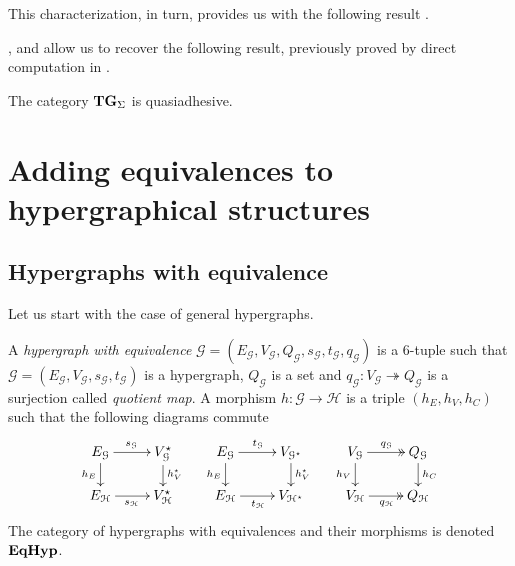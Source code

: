\documentclass[a4paper,UKenglish,cleveref,pdftex,thm-restate,numberwithinsect]{lipics-v2021}
\newcommand{\catname}[1]{\textbf{\textup{#1}}}
\newcommand{\hyp}{\catname{Hyp}}
\newcommand{\EqHyp}{\catname{EqHyp}} %
\newcommand{\tg}[0]{\catname{TG}_{\Sigma}}
\newcommand{\eto}{\twoheadrightarrow}
\begin{document}
This characterization, in turn, provides us with the following result \cite{CastelnovoGM24,castelnovo2023thesis}. 



,  and  allow us to recover the following result, previously proved by direct computation in \cite[Thm.~4.2]{CorradiniG05}.
\begin{corollary}
	The category $\tg$ is quasiadhesive.
\end{corollary}

\section{Adding equivalences to hypergraphical structures}
\label{hypereq}

\subsection{Hypergraphs with equivalence}

Let us start with the case of general hypergraphs.

\begin{definition}
	A \emph{hypergraph with equivalence} $\mathcal{G} = (E_\mathcal{G}, V_{\mathcal{G}}, Q_\mathcal{G}, s_\mathcal{G}, t_\mathcal{G}, q_\mathcal{G})$ is a 6-tuple such that $\mathcal{G} = (E_\mathcal{G}, V_{\mathcal{G}}, s_\mathcal{G}, t_\mathcal{G})$ is a hypergraph, $Q_\mathcal{G}$ is a set and $q_{\mathcal{G}}: V_{\mathcal{G}}\eto Q_{\mathcal{G}}$ is a surjection called \emph{quotient map}. 
	A morphism $h\colon \mathcal{G\to H}$ is a triple $(h_E, h_V, h_C)$ such that the following diagrams commute
	\[\xymatrix@R=15pt{
		{E_\mathcal{G}}\ar[r]^{s_\mathcal{G}}\ar[d]_{h_E} & {V_{\mathcal{G}}^\star}\ar[d]^{h_V^\star} & {E_\mathcal{G}}\ar[r]^{t_\mathcal{G}}\ar[d]_{h_E} & {V_{\mathcal{G}^\star}}\ar[d]^{h_V^\star} & {V_\mathcal{G}}\ar@{>>}[r]^{q_\mathcal{G}}\ar[d]_{h_V} & {Q_{\mathcal{G}}} \ar[d]^{h_C} \\
		{E_\mathcal{H}}\ar[r]_{s_\mathcal{H}} & {V_{\mathcal{H}}^\star}	& {E_\mathcal{H}}\ar[r]_{t_\mathcal{H}} & {V_{\mathcal{H}^\star}}& {V_\mathcal{H}}\ar@{>>}[r]_{q_\mathcal{H}} & {Q_\mathcal{H}}
	}\]
	The category of hypergraphs with equivalences and their morphisms is denoted $\EqHyp$.
	
\end{definition}
\end{document}
